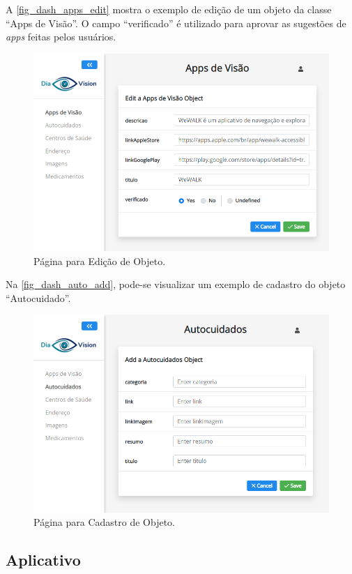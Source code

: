 A \autoref{fig_dash_apps_edit} mostra o exemplo de edição de um objeto da classe ``Apps de Visão''. O campo ``verificado''
é utilizado para aprovar as sugestões de \emph{apps} feitas pelos usuários.

\begin{figure}[htb]
    \caption{\label{fig_dash_apps_edit}Página para Edição de Objeto.}
    \begin{center}
        \includegraphics[scale=0.53]{Imagens/desenvolvimento/apps_visao_edit_admin.png}
    \end{center}
\end{figure}

Na \autoref{fig_dash_auto_add}, pode-se visualizar um exemplo de cadastro do objeto ``Autocuidado''.

\begin{figure}[htb]
    \caption{\label{fig_dash_auto_add}Página para Cadastro de Objeto.}
    \begin{center}
        \includegraphics[scale=0.53]{Imagens/desenvolvimento/autocuidados_add_admin.png}
    \end{center}
\end{figure}

\newpage

\subsection{Aplicativo}